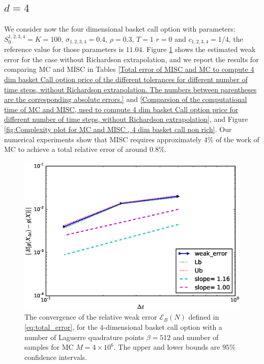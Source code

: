 \subsection{$d=4$}
We consider now  the four dimensional basket call option  with parameters:  $S_0^{1,2,3,4}=K=100$, $\sigma_{1,2,3,4}=0.4$, $\rho=0.3$, $T=1$ $r=0$ and $c_{1,2,3,4}=1/4$, the reference value for those parameters  is  $11.04$. Figure \ref{fig:Weak_rate_4_dim_basket} shows the estimated   weak error  for the case without Richardson extrapolation, and we report the results for comparing MC and MISC in Tables \ref{Total error of MISC and MC to compute 4 dim basket  Call option price of the different tolerances for different number of time steps, without Richardson extrapolation. The numbers between parentheses are the corresponding absolute errors.} and \ref{Comparsion of the computational time of  MC and MISC, used to compute 4 dim basket Call option price  for different number of time steps, without Richardson extrapolation}, and Figure \ref{fig:Complexity plot for MC and MISC , 4 dim basket call non rich}.  Our numerical experiments show that MISC  requires approximately $4\%$ of the work of MC  to achieve a total relative error of around $0.8\%$.

\FloatBarrier
\begin{figure}[h!]
		\centering
		\includegraphics[width=0.4\linewidth]{./figures/basket_call_4d_time_stepping/weak_convergence/weak_convergence_order_basket_option_4d_relative_M_4_10_6_beta_256}

	\caption{The convergence of the relative weak error  $\mathcal{E}_B(N)$ defined in \ref{eq:total_error}, for the $4$-dimensional basket call option with  a number of Laguerre  quadrature points  $\beta=512$ and number of samples for MC $M=4 \times 10^6$. The upper and lower bounds are $95\%$ confidence intervals.}
	\label{fig:Weak_rate_4_dim_basket}
\end{figure}
\FloatBarrier

